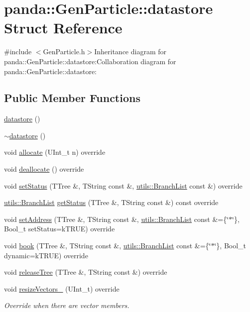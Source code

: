 \hypertarget{structpanda_1_1GenParticle_1_1datastore}{
\section{panda::GenParticle::datastore Struct Reference}
\label{structpanda_1_1GenParticle_1_1datastore}
}


{\ttfamily \#include $<$GenParticle.h$>$}Inheritance diagram for panda::GenParticle::datastore:Collaboration diagram for panda::GenParticle::datastore:\subsection*{Public Member Functions}
\begin{DoxyCompactItemize}
\item 
\hyperlink{structpanda_1_1GenParticle_1_1datastore_ad1aab7880b9699f04e712abc69799953}{datastore} ()
\item 
\hyperlink{structpanda_1_1GenParticle_1_1datastore_af04b1b2c05d433c8020d5250db10d7d9}{$\sim$datastore} ()
\item 
void \hyperlink{structpanda_1_1GenParticle_1_1datastore_a431a6d40dc4affce7107d9368d2932a9}{allocate} (UInt\_\-t n) override
\item 
void \hyperlink{structpanda_1_1GenParticle_1_1datastore_afe415117bf9f06e163aff5e341c9ef00}{deallocate} () override
\item 
void \hyperlink{structpanda_1_1GenParticle_1_1datastore_ae4c5f9b8868d49879bba872aeb7b1027}{setStatus} (TTree \&, TString const \&, \hyperlink{classpanda_1_1utils_1_1BranchList}{utils::BranchList} const \&) override
\item 
\hyperlink{classpanda_1_1utils_1_1BranchList}{utils::BranchList} \hyperlink{structpanda_1_1GenParticle_1_1datastore_af83451f0c94efe8daeb7769571e81aef}{getStatus} (TTree \&, TString const \&) const override
\item 
void \hyperlink{structpanda_1_1GenParticle_1_1datastore_ae55290c7499a0b5c80309462637d9e73}{setAddress} (TTree \&, TString const \&, \hyperlink{classpanda_1_1utils_1_1BranchList}{utils::BranchList} const \&=\{\char`\"{}$\ast$\char`\"{}\}, Bool\_\-t setStatus=kTRUE) override
\item 
void \hyperlink{structpanda_1_1GenParticle_1_1datastore_a115b560e4e4ecfa3d7c0a2fbbcafe5b9}{book} (TTree \&, TString const \&, \hyperlink{classpanda_1_1utils_1_1BranchList}{utils::BranchList} const \&=\{\char`\"{}$\ast$\char`\"{}\}, Bool\_\-t dynamic=kTRUE) override
\item 
void \hyperlink{structpanda_1_1GenParticle_1_1datastore_a7c4f6ca82174720a87fa2371f40000d7}{releaseTree} (TTree \&, TString const \&) override
\item 
void \hyperlink{structpanda_1_1GenParticle_1_1datastore_a28a604490b71305ae71b9671e3ea0bdf}{resizeVectors\_\-} (UInt\_\-t) override
\begin{DoxyCompactList}\small\item\em Override when there are vector members. \item\end{DoxyCompactList}\end{DoxyCompactItemize}


